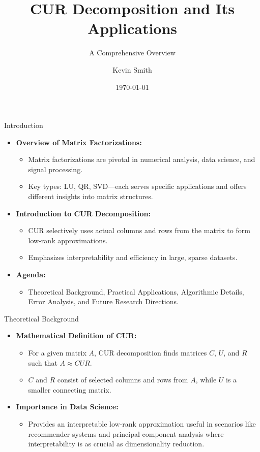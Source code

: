 \documentclass[pdf]{beamer}
\title{CUR Decomposition and Its Applications}
\subtitle{A Comprehensive Overview}
\author{Kevin Smith}
\institute{Department of Mathematics \\ Your University Name}
\date{\today}
\begin{document}
\begin{frame}
    \titlepage
\end{frame}

\begin{frame}{Introduction}
    \begin{itemize}
        \item \textbf{Overview of Matrix Factorizations:}
            \begin{itemize}
                \item Matrix factorizations are pivotal in numerical analysis, data science, and signal processing.
                \item Key types: LU, QR, SVD—each serves specific applications and offers different insights into matrix structures.
            \end{itemize}
        \item \textbf{Introduction to CUR Decomposition:}
            \begin{itemize}
                \item CUR selectively uses actual columns and rows from the matrix to form low-rank approximations.
                \item Emphasizes interpretability and efficiency in large, sparse datasets.
            \end{itemize}
        \item \textbf{Agenda:}
            \begin{itemize}
                \item Theoretical Background, Practical Applications, Algorithmic Details, Error Analysis, and Future Research Directions.
            \end{itemize}
    \end{itemize}
\end{frame}

\begin{frame}{Theoretical Background}
    \begin{itemize}
        \item \textbf{Mathematical Definition of CUR:}
            \begin{itemize}
                \item For a given matrix \( A \), CUR decomposition finds matrices \( C \), \( U \), and \( R \) such that \( A \approx CUR \).
                \item \( C \) and \( R \) consist of selected columns and rows from \( A \), while \( U \) is a smaller connecting matrix.
            \end{itemize}
        \item \textbf{Importance in Data Science:}
            \begin{itemize}
                \item Provides an interpretable low-rank approximation useful in scenarios like recommender systems and principal component analysis where interpretability is as crucial as dimensionality reduction.
            \end{itemize}
    \end{itemize}
\end{frame}
\end{document}
